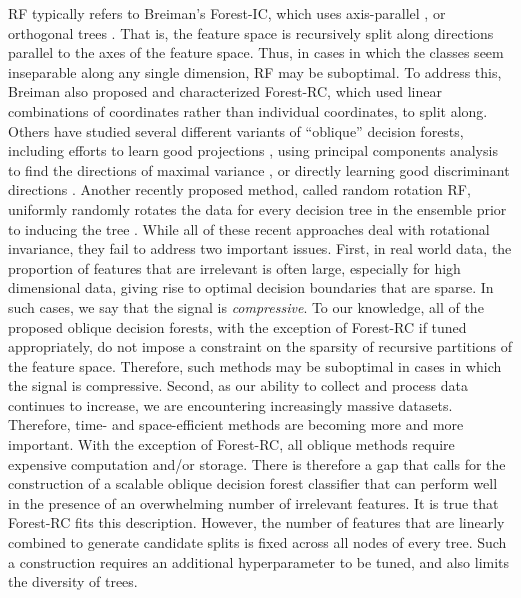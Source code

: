 \documentclass[10pt]{article}
\begin{document}
RF typically refers to Breiman's Forest-IC, which uses axis-parallel \cite{Heath1993}, or orthogonal trees \cite{Menze2011}. That is, the feature space is recursively split along directions parallel to the axes of the feature space. Thus, in cases in which the classes seem inseparable along any single dimension, RF may be suboptimal. To address this, Breiman also proposed and characterized Forest-RC, which used linear combinations of coordinates rather than individual coordinates, to split along. Others have studied several different variants of ``oblique'' decision forests, including efforts to learn good projections \cite{Heath1993,Tan2005}, using principal components analysis to find the directions of maximal variance \cite{Ho1998,Rodriguez2006}, or directly learning good discriminant directions \cite{Menze2011}. Another recently proposed method, called random rotation RF, uniformly randomly rotates the data for every decision tree in the ensemble prior to inducing the tree \cite{Blaser2015}. While all of these recent approaches deal with rotational invariance, they fail to address two important issues. First, in real world data, the proportion of features that are irrelevant is often large, especially for high dimensional data, giving rise to optimal decision boundaries that are sparse. In such cases, we say that the signal is \textit{compressive}. To our knowledge, all of the proposed oblique decision forests, with the exception of Forest-RC if tuned appropriately, do not impose a constraint on the sparsity of recursive partitions of the feature space. Therefore, such methods may be suboptimal in cases in which the signal is compressive. Second, as our ability to collect and process data continues to increase, we are encountering increasingly massive datasets. Therefore, time- and space-efficient methods are becoming more and more important. With the exception of Forest-RC, all oblique methods require expensive computation and/or storage. There is therefore a gap that calls for the construction of a scalable oblique decision forest classifier that can perform well in the presence of an overwhelming number of irrelevant features. It is true that Forest-RC fits this description. However, the number of features that are linearly combined to generate candidate splits is fixed across all nodes of every tree. Such a construction requires an additional hyperparameter to be tuned, and also limits the diversity of trees. 
\end{document}

